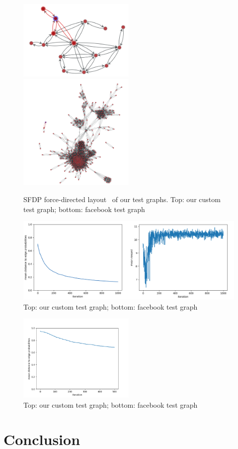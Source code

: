 \documentclass[a4paper,12pt]{article}
\begin{document}
 \begin{figure}
  \centering
    \includegraphics[width=0.5\textwidth]{test_graph.png}
        \includegraphics[width=0.5\textwidth]{facebook.png}
      \caption{SFDP force-directed layout~\cite{hu2005efficient} of our test graphs. Top: our custom test graph; bottom: facebook test graph}
        \label{fig:testgraph}
\end{figure}

 \begin{figure}
  \centering
    \includegraphics[width=\textwidth]{total_test.png}
      \caption{Top: our custom test graph; bottom: facebook test graph}
        \label{fig:testgraph}
\end{figure}

 \begin{figure}
  \centering
    \includegraphics[width=0.5\textwidth]{conv_weights_twitter.png}
      \caption{Top: our custom test graph; bottom: facebook test graph}
        \label{fig:testgraph}
\end{figure}



\section{Conclusion}

\newpage



\end{document}
